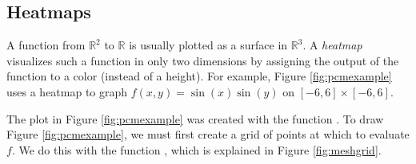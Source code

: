 \begin{comment}
\begin{problem} Plot the curve $\sin(x)\frac{1}{x+1}$ from $0$ to $10$.

Use blue shading under the curve when it is positive and red when it is negative (you may want to consider using the \li{fill_between} command.
Make the line dotted.
Label the x-axis ``x-axis'', the y-axis ``y-axis'',and the plot ``My Plot''.
Enable the grid lines.

Finally, use the \li{scatter} command to include a scatter plot of half of the value of the function at each of its maxima and minima in the range.
Display these points as upward-pointing triangles.
Don't forget to make sure the x limits of the plot are still 0 and 10.

\emph{Helpful Hint}: Since you are working with arrays of discrete values, you will want to find the index values where your $x$ and $y$ values are closest to the actual maxima and minima. As you work, consider the following:
\begin{itemize}
\item How would you manually find maxima and minima of a function?
\item How could you do something similar with your $x$ and $y$ arrays?
\end{itemize}
Your plot should look like the figure below.

\begin{figure}[H]
\texttt{[image: soln3.pdf]}
\label{fig:problem3}
\end{figure}
\end{problem}
\end{comment}




\subsection*{Heatmaps}
A function from $\mathbb{R}^2$ to $\mathbb{R}$ is usually plotted as a surface in $\mathbb{R}^3$.
A \emph{heatmap} visualizes such a function in only two dimensions by assigning the output of the function to a color (instead of a height).
For example, Figure \ref{fig:pcmexample} uses a heatmap to graph $f(x,y) = \sin(x)\sin(y)$ on $[-6,6] \times [-6,6]$.

The plot in Figure \ref{fig:pcmexample} was created with the function .
To draw Figure \ref{fig:pcmexample}, we must first create a grid of points at which to evaluate $f$.
We do this with the function , which is explained in Figure \ref{fig:meshgrid}.

